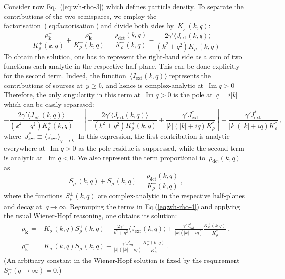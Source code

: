 \documentclass[preprint,aps,eqsecnum, prb]{revtex4-1}
\newcommand{\fplus}[1]{{#1}^{+}}
\newcommand{\fminus}[1]{{#1}^{-}}
\newcommand{\fplusminus}[1]{{#1}^{\pm}}
\renewcommand{\Im}{\mathop{\mathrm{Im}}\nolimits}
\newcommand{\dct}[1]{{#1}_\mathrm{dct}}
\begin{document}
 Consider now Eq.~(\ref{eq:wh-rho-3}) which defines particle  density.
 To separate the contributions of the two semispaces, we employ
 the factorisation~(\ref{eq:factorisation}) and divide both sides
 by~$\fminus{K}_\rho(k, q)$:
 \begin{equation}
   \label{eq:wh-rho-4}
   \frac{\fplus{\rho}_{\bm k}}{\fplus{K}_\rho(k, q)}
    + \frac{\fminus{\rho}_{\bm k}}{\fminus{K}_\rho(k, q)}
    = \frac{\dct{\rho}(k, q)}{\fminus{K}_\rho(k, q)}
    - \frac{2 \gamma' \langle J_{\mathrm{ext}}(k, q) \rangle}{(k^2 + q^2)\fplus{K}_\rho(k, q)}
\end{equation}
To obtain the solution, one has to represent the right-hand side as a sum of
two functions each analytic in the respective half-plane. This can be done
explicitly for the second term. Indeed,
the function~$\langle J_{\mathrm{ext}}(k, q) \rangle$ represents
the contributions of sources at~$y \geq 0$, and hence is complex-analytic
at~$\Im q > 0$. Therefore, the only singularity in this term at~$\Im q > 0$
is the pole at~$q = i |k|$ which can be easily separated:
\begin{equation}
   -\frac{2 \gamma' \langle J_{\mathrm{ext}}(k, q) \rangle}{(k^2 + q^2)\fplus{K}_\rho(k, q)}
   = \left[-\frac{2 \gamma' \langle J_{\mathrm{ext}}(k, q) \rangle}{(k^2 + q^2)\fplus{K}_\rho(k, q)}  + \frac{\gamma' J_\mathrm{ext}^\ast}{|k|(|k| + i q) K_\rho^\ast}\right]
   - \frac{\gamma' J_\mathrm{ext}^\ast}{|k|(|k| + i q) K_\rho^\ast}
   \ ,
\end{equation}
where~$J_\mathrm{ext}^\ast \equiv \langle J_\mathrm{ext} \rangle_{q = i |k|}$
In this expression, the first contribution is analytic everywhere
at~$\Im q > 0$ as the pole residue is suppressed, while
the second term is analytic at~$\Im q < 0$. We also represent the term
proportional to~$\dct{\rho}(k, q)$ as
\begin{equation}
  \label{eq:chi-def}
  \fplus{S}_\rho(k, q) + \fminus{S}_\rho(k, q)
  = \frac{\dct{\rho}(k, q)}{\fminus{K}_\rho(k, q)}
\ ,
\end{equation}
where the functions~$\fplusminus{S}_{\rho}(k, q)$ are complex-analytic
in the respective half-planes and decay at~$q \to \infty$. Regrouping
the terms in Eq.(\ref{eq:wh-rho-4}) and applying the usual Wiener-Hopf
reasoning, one obtains its solution:
\begin{align}
  \label{eq:solution-rho-plus-0}
  \fplus{\rho}_{\bm k} ={}& \fplus{K}_\rho(k, q)  \fplus{S}_\rho(k, q)
   - \frac{2 \gamma'}{k^2 + q^2} \langle J_\mathrm{ext}(k, q) \rangle
   + \frac{\gamma'  J_\mathrm{ext}^\ast}{|k|(|k| + iq)}
     \frac{\fplus{K}_\rho(k, q)}{K_\rho^\ast}
   \ ,
   \\
   \label{eq:solution-rho-minus}
   \fminus{\rho}_{\bm k} = {}& \fminus{K}_\rho(k, q) \fminus{S}_\rho(k, q)
   - \frac{\gamma' J_\mathrm{ext}^\ast}{|k|(|k| + iq)}\frac{\fminus{K}_\rho(k, q)}{K_\rho^\ast}
   \ .
\end{align}
(An arbitrary constant in the Wiener-Hopf solution is fixed
by the requirement~$\fplusminus{S}_{\rho}(q\to \infty) = 0$.)
\end{document}
